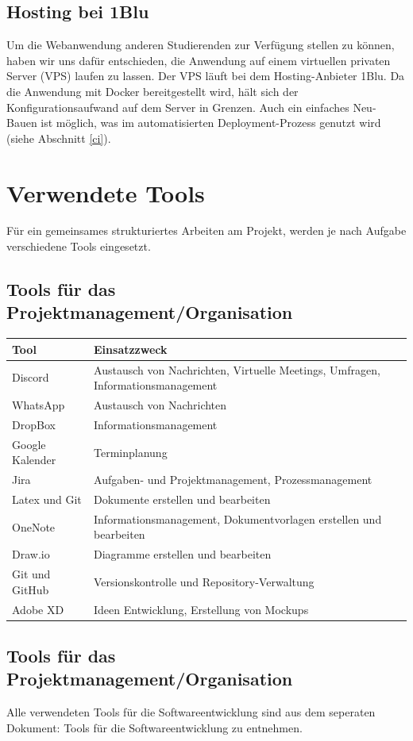 \documentclass[a4paper,11pt]{scrartcl}
\begin{document}
	\subsection{Hosting bei 1Blu}
Um die Webanwendung anderen Studierenden zur Verfügung stellen zu können, haben wir uns dafür entschieden, die Anwendung auf einem virtuellen privaten Server (VPS) laufen zu lassen. Der VPS läuft bei dem Hosting-Anbieter 1Blu. 
Da die Anwendung mit Docker bereitgestellt wird, hält sich der Konfigurationsaufwand auf dem Server in Grenzen. Auch ein einfaches Neu-Bauen ist möglich, was im automatisierten Deployment-Prozess genutzt wird (siehe Abschnitt \ref{ci}).

\section{Verwendete Tools}
Für ein gemeinsames strukturiertes Arbeiten am Projekt, werden je nach Aufgabe verschiedene Tools eingesetzt. 
	\subsection{Tools für das Projektmanagement/Organisation}
\begin{table}[H]
\begin{tabular}{|p{4cm}|p{8cm}|}
\hline
\textbf{Tool} &\textbf{Einsatzzweck} \\ \hline
Discord &  Austausch von Nachrichten, Virtuelle Meetings, Umfragen, Informationsmanagement\\ \hline
WhatsApp &  Austausch von Nachrichten\\ \hline
DropBox & Informationsmanagement \\ \hline
Google Kalender & Terminplanung   \\ \hline
Jira &  Aufgaben- und Projektmanagement, Prozessmanagement \\ \hline
Latex und Git &  Dokumente erstellen und bearbeiten \\ \hline
OneNote &  Informationsmanagement, Dokumentvorlagen erstellen und bearbeiten \\ \hline
Draw.io &  Diagramme erstellen und bearbeiten \\ \hline
Git und GitHub & Versionskontrolle und Repository-Verwaltung \\ \hline
Adobe XD & Ideen Entwicklung, Erstellung von Mockups \\ \hline
\end{tabular}
\end{table}
	\subsection{Tools für das Projektmanagement/Organisation}
Alle verwendeten Tools für die Softwareentwicklung sind aus dem seperaten Dokument: \glqq Tools für die Softwareentwicklung\grqq{} zu entnehmen.
\end{document}
